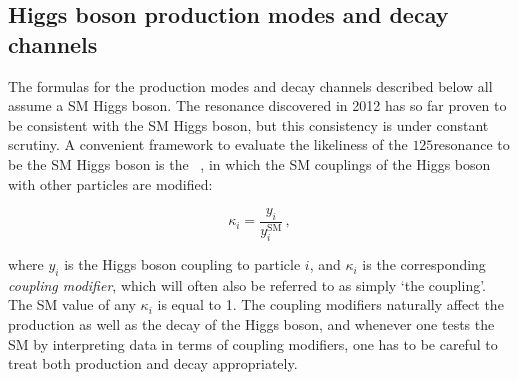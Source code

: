 \subsection{Higgs boson production modes and decay channels}
\label{sec:production-decay}

The formulas for the production modes and decay channels described below all assume a SM Higgs boson.
% 
The resonance discovered in 2012 has so far proven to be consistent with the SM Higgs boson, but this consistency is under constant scrutiny.
% 
A convenient framework to evaluate the likeliness of the $125$\GeV resonance to be the SM Higgs boson is the \textit{\kappaframework}~\cite{LHCHXSWG:YR3}, in which the SM couplings of the Higgs boson with other particles are modified:
% 
\begin{linenomath*}
\begin{equation}
\kappa_{i} = \frac{y_{i}}{y_{i}^{\text{SM}}}\,,
\end{equation}
\end{linenomath*}
% 
where $y_i$ is the Higgs boson coupling to particle $i$, and $\kappa_i$ is the corresponding \textit{coupling modifier}, which will often also be referred to as simply `the coupling'.
% 
The SM value of any $\kappa_i$ is equal to 1.
% 
The coupling modifiers naturally affect the production as well as the decay of the Higgs boson, and whenever one tests the SM by interpreting data in terms of coupling modifiers, one has to be careful to treat both production and decay appropriately.


